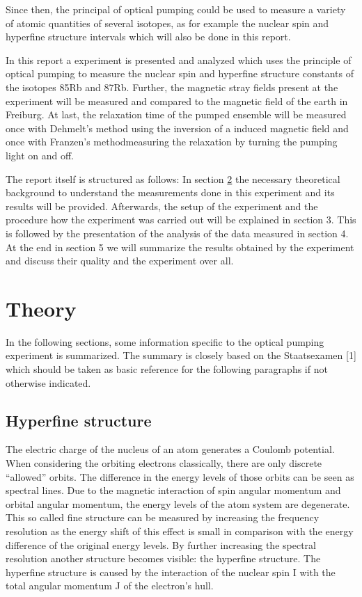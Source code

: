 \documentclass{article}
\begin{document}
Since then, the principal of optical pumping could be used to measure
a variety of atomic quantities of several isotopes, as for example
the nuclear spin and hyperfine structure intervals which will also
be done in this report.

In this report a experiment is presented and analyzed which uses the
principle of optical pumping to measure the nuclear spin and 
hyperfine structure constants of the
isotopes 85Rb and 87Rb. Further, the magnetic stray fields present
at the experiment will be measured and compared to the magnetic
field of the earth in Freiburg. At last, the relaxation time of the
pumped ensemble will be measured once with Dehmelt's method using
the inversion of a induced magnetic field and once with 
Franzen's methodmeasuring the relaxation by turning the pumping
light on and off.

The report itself is structured as follows: In section 
\hyperref[sec:theory]{2} the necessary theoretical background
to understand the measurements done in this experiment and its
results will be provided. Afterwards, the setup of the experiment
and the procedure how the experiment was carried out will be
explained in section 3. This is followed by the presentation of the analysis of the data
measured in section 4. At the end in section 5 we will summarize
the results obtained by the experiment and discuss their quality
and the experiment over all.
\section{Theory}
\label{sec: theory}
In the following sections, some information specific to the optical
pumping experiment is summarized. The summary is closely based on
the Staatsexamen [1] which should be taken as basic reference for
the following paragraphs if not otherwise indicated.
\subsection{Hyperfine structure}
The electric charge of the nucleus of an atom generates a Coulomb
potential. When considering the orbiting electrons classically,
there are only discrete “allowed” orbits. The difference in the
energy levels of those orbits can be seen as spectral lines. Due
to the magnetic interaction of spin angular momentum and orbital
angular momentum, the energy levels of the atom system are
degenerate. This so called fine structure can be measured by
increasing the frequency resolution as the energy shift of this
effect is small in comparison with the energy difference of the
original energy levels. By further increasing the spectral
resolution another structure becomes visible: the hyperfine
structure. The hyperfine structure is caused by the interaction of
the nuclear spin I with the total angular momentum J of the
electron's hull.
\end{document}
